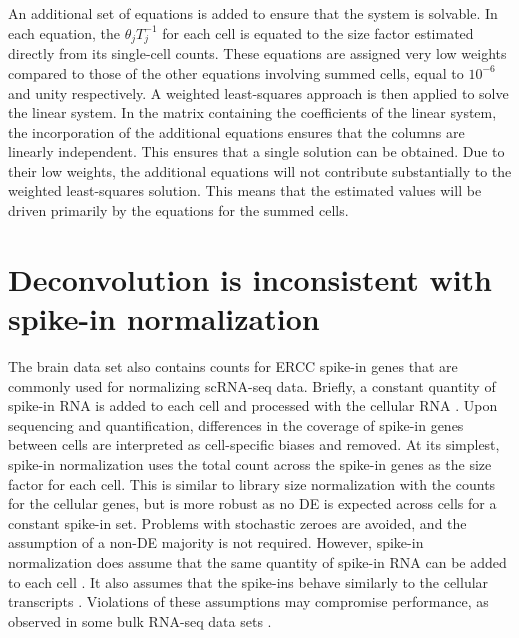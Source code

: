 \documentclass{article}
\begin{document}
An additional set of equations is added to ensure that the system is solvable.
In each equation, the $\theta_jT_j^{-1}$ for each cell is equated to the size factor estimated directly from its single-cell counts.
These equations are assigned very low weights compared to those of the other equations involving summed cells, equal to $10^{-6}$ and unity respectively.
A weighted least-squares approach is then applied to solve the linear system.
In the matrix containing the coefficients of the linear system, the incorporation of the additional equations ensures that the columns are linearly independent.
This ensures that a single solution can be obtained.
Due to their low weights, the additional equations will not contribute substantially to the weighted least-squares solution.
This means that the estimated values will be driven primarily by the equations for the summed cells.

\section{Deconvolution is inconsistent with spike-in normalization}
The brain data set also contains counts for ERCC spike-in genes that are commonly used for normalizing scRNA-seq data.
Briefly, a constant quantity of spike-in RNA is added to each cell and processed with the cellular RNA \cite{stegle2015computational}.
Upon sequencing and quantification, differences in the coverage of spike-in genes between cells are interpreted as cell-specific biases and removed.
At its simplest, spike-in normalization uses the total count across the spike-in genes as the size factor for each cell.
This is similar to library size normalization with the counts for the cellular genes, but is more robust as no DE is expected across cells for a constant spike-in set.
Problems with stochastic zeroes are avoided, and the assumption of a non-DE majority is not required.
However, spike-in normalization does assume that the same quantity of spike-in RNA can be added to each cell \cite{robinson2010scaling,marinov2014singlecell}.
It also assumes that the spike-ins behave similarly to the cellular transcripts \cite{grun2015design}.
Violations of these assumptions may compromise performance, as observed in some bulk RNA-seq data sets \cite{risso2014normalization}.
\end{document}
